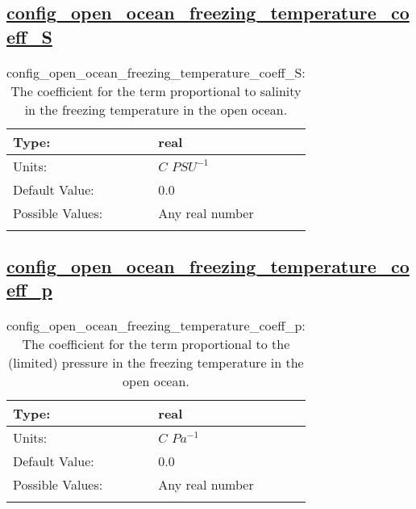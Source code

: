 \subsection[config\_open\_ocean\_freezing\_temperature\_coeff\_S]{\hyperref[sec:nm_tab_eos]{config\_open\_ocean\_freezing\_temperature\_coeff\_S}}
\label{subsec:nm_sec_config_open_ocean_freezing_temperature_coeff_S}
\begin{center}
\begin{longtable}{| p{2.0in} || p{4.0in} |}
    \hline
    Type: & real \\
    \hline
    Units: & $C$ $PSU^{-1}$ \\
    \hline
    Default Value: & 0.0 \\
    \hline
    Possible Values: & Any real number \\
    \hline
    \caption{config\_open\_ocean\_freezing\_temperature\_coeff\_S: The coefficient for the term proportional to salinity in the freezing temperature in the open ocean.}
\end{longtable}
\end{center}
\subsection[config\_open\_ocean\_freezing\_temperature\_coeff\_p]{\hyperref[sec:nm_tab_eos]{config\_open\_ocean\_freezing\_temperature\_coeff\_p}}
\label{subsec:nm_sec_config_open_ocean_freezing_temperature_coeff_p}
\begin{center}
\begin{longtable}{| p{2.0in} || p{4.0in} |}
    \hline
    Type: & real \\
    \hline
    Units: & $C$ $Pa^{-1}$ \\
    \hline
    Default Value: & 0.0 \\
    \hline
    Possible Values: & Any real number \\
    \hline
    \caption{config\_open\_ocean\_freezing\_temperature\_coeff\_p: The coefficient for the term proportional to the (limited) pressure in the freezing temperature in the open ocean.}
\end{longtable}
\end{center}

